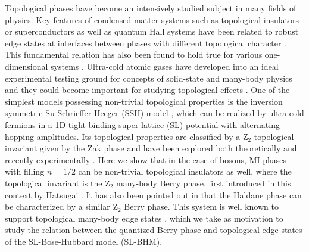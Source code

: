 \documentclass[pra,aps,twocolumn,showpacs]{revtex4}
\begin{document}
\keywords{}
 
\date{\today}
 
\maketitle
 
Topological phases have become an intensively studied
subject in many fields of physics. Key features of condensed-matter systems such 
as topological insulators \cite{Kane-PRL-2005,Bernevig-PRL-2006,top-insulator} or 
superconductors \cite{top-superconductors} as well as quantum Hall systems 
\cite{Klitzing-PRL-1980,Laughlin-PRL-1981,Thouless-PRL-1982,Moore-Read-NucPhys-1991}
have been related to robust edge states at interfaces between phases with different 
topological character \cite{Hatsugai1993}. This fundamental relation has also 
been found to hold true for various one-dimensional systems \cite{Kitaev2001,Ryu2002,Delplace2011,Kraus2012,Verbin2013}.
Ultra-cold atomic gases 
have developed into an ideal experimental testing 
ground for concepts of solid-state and many-body physics 
\cite{Dalibard-RMP} and they could become
important for studying topological effects
\cite{Alba-PRL-2011,Tarruel-Nature-2012,Goldman-PRL-2012,Atala2012}. One of the
simplest models possessing non-trivial topological properties is the inversion symmetric Su-Schrieffer-Heeger (SSH) model \cite{SSH1979}, 
which can be realized by ultra-cold 
fermions in a 1D tight-binding super-lattice (SL)
potential with alternating hopping amplitudes. 
Its topological properties are classified by a Z$_2$ topological invariant
given by the Zak phase \cite{Zak1989,Berry1984} and have been explored both theoretically \cite{Ryu2002,Delplace2011,Lang-PRL-2012} 
and recently experimentally \cite{Atala2012}.
Here we show that in the case of bosons, MI phases with filling $n=1/2$
can be non-trivial topological insulators as well, where the topological invariant is
the Z$_2$ many-body Berry phase, first introduced in this context by Hatsugai \cite{Hatsugai2006}.
It has also been pointed out in \cite{Hatsugai2006,Hatsugai2007} that the Haldane phase \cite{Haldane1983} 
can be characterized by a similar Z$_2$ Berry phase. 
This system is well known to support topological many-body edge states \cite{Kennedy1990}, which we 
take as motivation to study the relation between the quantized Berry phase and topological edge states of the SL-Bose-Hubbard model (SL-BHM).
\end{document}
